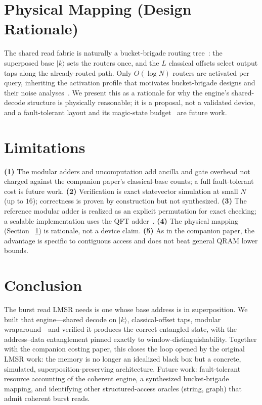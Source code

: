 \documentclass[11pt]{article}
\theoremstyle{definition}
\begin{document}
\section{Physical Mapping (Design Rationale)}
\label{sec:physical}
The shared read fabric is naturally a bucket-brigade routing
tree~\cite{giovannetti2008architectures}: the superposed base $\lvert k\rangle$
sets the routers once, and the $L$ classical offsets select output taps along the
already-routed path. Only $O(\log N)$ routers are activated per query, inheriting
the activation profile that motivates bucket-brigade designs and their noise
analyses~\cite{arunachalam2015robustness,hann2021resilience}. We present this as a
rationale for why the engine's shared-decode structure is physically reasonable;
it is a proposal, not a validated device, and a fault-tolerant layout and its
magic-state budget~\cite{dimatteo2020faulttolerant} are future work.

\section{Limitations}
\label{sec:limitations}
\textbf{(1)} The modular adders and uncomputation add ancilla and gate overhead not
charged against the companion paper's classical-base counts; a full fault-tolerant
cost is future work. \textbf{(2)} Verification is exact statevector simulation at
small $N$ (up to $16$); correctness is proven by construction but not synthesized.
\textbf{(3)} The reference modular adder is realized as an explicit permutation for
exact checking; a scalable implementation uses the QFT
adder~\cite{draper2000adder}. \textbf{(4)} The physical mapping (Section~%
\ref{sec:physical}) is rationale, not a device claim. \textbf{(5)} As in the
companion paper, the advantage is specific to contiguous access and does not beat
general QRAM lower bounds.

\section{Conclusion}
\label{sec:conclusion}
The burst read LMSR needs is one whose base address is in superposition. We built
that engine---shared decode on $\lvert k\rangle$, classical-offset taps, modular
wraparound---and verified it produces the correct entangled state, with the
address--data entanglement pinned exactly to window-distinguishability. Together
with the companion costing paper, this closes the loop opened by the original LMSR
work: the memory is no longer an idealized black box but a concrete, simulated,
superposition-preserving architecture. Future work: fault-tolerant resource
accounting of the coherent engine, a synthesized bucket-brigade mapping, and
identifying other structured-access oracles (string, graph) that admit coherent
burst reads.
\end{document}

